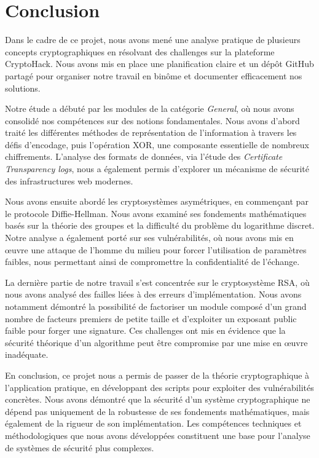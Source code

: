 \section{Conclusion}

Dans le cadre de ce projet, nous avons mené une analyse pratique de plusieurs concepts cryptographiques en résolvant des challenges sur la plateforme CryptoHack. Nous avons mis en place une planification claire et un dépôt GitHub partagé pour organiser notre travail en binôme et documenter efficacement nos solutions.

Notre étude a débuté par les modules de la catégorie \textit{General}, où nous
avons consolidé nos compétences sur des notions fondamentales. Nous avons
d'abord traité les différentes méthodes de représentation de l'information
à travers les défis d'encodage, puis l'opération XOR, une composante
essentielle de nombreux chiffrements. L'analyse des formats de données, via
l'étude des \textit{Certificate Transparency logs}, nous a également permis
d'explorer un mécanisme de sécurité des infrastructures web modernes.

Nous avons ensuite abordé les cryptosystèmes asymétriques, en commençant par le
protocole Diffie-Hellman. Nous avons examiné ses fondements mathématiques basés
sur la théorie des groupes et la difficulté du problème du logarithme discret.
Notre analyse a également porté sur ses vulnérabilités, où nous avons mis en
œuvre une attaque de l'homme du milieu pour forcer l'utilisation de paramètres
faibles, nous permettant ainsi de compromettre la confidentialité de l'échange.

La dernière partie de notre travail s'est concentrée sur le cryptosystème RSA,
où nous avons analysé des failles liées à des erreurs d'implémentation. Nous
avons notamment démontré la possibilité de factoriser un module composé d'un
grand nombre de facteurs premiers de petite taille et d'exploiter un exposant
public faible pour forger une signature. Ces challenges ont mis en évidence
que la sécurité théorique d'un algorithme peut être compromise par une mise
en œuvre inadéquate.

En conclusion, ce projet nous a permis de passer de la théorie cryptographique
à l'application pratique, en développant des scripts pour exploiter des
vulnérabilités concrètes. Nous avons démontré que la sécurité d'un système
cryptographique ne dépend pas uniquement de la robustesse de ses fondements
mathématiques, mais également de la rigueur de son implémentation. Les
compétences techniques et méthodologiques que nous avons développées
constituent une base pour l'analyse de systèmes de sécurité plus complexes.